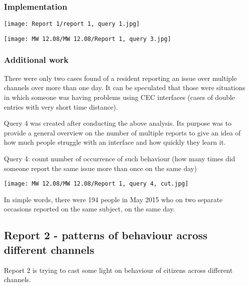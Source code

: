 			\subsubsection{Implementation}

\begin{center}
  \texttt{[image: Report 1/report 1, query 1.jpg]}
\end{center}

\begin{center}
  \texttt{[image: MW 12.08/MW 12.08/Report 1, query 3.jpg]}
\end{center}
	
			\subsubsection{Additional work}
			
There were only two cases found of a resident reporting an issue over multiple channels over more than one day. It can be speculated that those were situations in which someone was having problems using CEC interfaces (cases of double entries with very short time distance).

Query 4 was created after conducting the above analysis. Its purpose was to provide a general overview on the number of multiple reports to give an idea of how much people struggle with an interface and how quickly they learn it.

Query 4: count number of occurrence of such behaviour (how many times did someone report the same issue more than once on the same day)

\begin{center}
  \texttt{[image: MW 12.08/MW 12.08/Report 1, query 4, cut.jpg]}
\end{center}



In simple words, there were 194 people in May 2015 who on two separate occasions reported on the same subject, on the same day.
			
		\subsection{Report 2 - patterns of behaviour across different channels}
		
Report 2 is trying to cast some light on behaviour of citizens across different channels.

